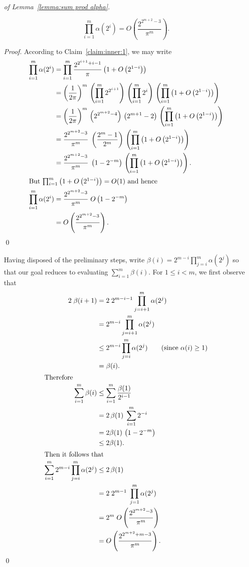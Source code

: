 \documentclass[a4paper,10pt]{llncs}
\begin{document}
\begin{proof}[of Lemma~\ref{lemma:sum prod alpha}]
\begin{claim}
\label{claim:inner:2}
$$
\prod_{i=1}^{m} \alpha(2^i)
=
O\left(
\frac{2^{2^{m+2}-3}}{\pi^m}
\right)
\text{.}
$$
\end{claim}
\begin{proof}
According to Claim~\ref{claim:inner:1}, we may write
\begin{align*}
\prod_{i=1}^{m} \alpha(2^i)
&=
\prod_{i=1}^{m} \frac{2^{2^{i+1} + i - 1}}{\pi}\left(1 + O\left(2^{1-i}\right)\right)
\\
&=
\left(
\frac{1}{2\pi}
\right)^{m}
\,
\left(
\prod_{i=1}^{m} 2^{2^{i+1}}
\right)
\,
\left(
\prod_{i=1}^{m} 2^i
\right)
\,
\left(
\prod_{i=1}^{m} \left(1 + O\left(2^{1-i}\right)\right)
\right)
\\
&=
\left(
\frac{1}{2\pi}
\right)^{m}
\,
\left(2^{2^{m+2}-4}\right)
\,
\left(2^{m+1}-2\right)
\,
\left(
\prod_{i=1}^{m} \left(1 + O\left(2^{1-i}\right)\right)
\right)
\\
&=
\frac{2^{2^{m+2}-3}}{\pi^m}
\;
\left(\frac{2^m-1}{2^m}\right)
\,
\left(
\prod_{i=1}^{m} \left(1 + O\left(2^{1-i}\right)\right)
\right)
\\
&=
\frac{2^{2^{m+2}-3}}{\pi^m}
\;
\left(1 - 2^{-m}\right)
\,
\left(
\prod_{i=1}^{m} \left(1 + O\left(2^{1-i}\right)\right)
\right)\text{.}
\\
\intertext{But
$\prod_{i=1}^{m} \left(1 + O\left(2^{1-i}\right)\right) = O(1)$ and hence}
\prod_{i=1}^{m} \alpha(2^i)
&=
\frac{2^{2^{m+2}-3}}{\pi^m}
\;
O\left(1 - 2^{-m}\right)
\\
&=
O\left(
\frac{2^{2^{m+2}-3}}{\pi^m}
\right)
\text{.}
\end{align*}
\qed
\end{proof}

Having disposed of the preliminary steps,
write $\beta(i) = 2^{m-i} \prod_{j=i}^{m} \alpha(2^j)$ so that our goal
reduces to evaluating $\sum_{i=1}^{m} \beta(i)$.
For $1 \leq i < m$, we first observe that
\begin{align*}
2\;\beta(i+1)
&=
2 \; 2^{m-i-1} \prod_{j=i+1}^{m} \alpha(2^{j}) 
\\
&= 
2^{m-i} \prod_{j=i+1}^{m} \alpha(2^{j}) 
\\
&\leq 
2^{m-i} \prod_{j=i}^{m} \alpha(2^{j}) \qquad\text{(since $\alpha(i) \geq 1$)}
\\
&= 
\beta(i)\text{.}
\\
\intertext{Therefore}
\sum_{i=1}^{m} \beta(i)
&\leq 
\sum_{i=1}^{m} \frac{\beta(1)}{2^{i-1}}
\\
&=
2\,\beta(1) \; \sum_{i=1}^{m} {2^{-i}}
\\
&=
2\beta(1) \, \left(1 - 2^{-m}\right)
\\
&\leq 
2\beta(1)\text{.}
\\
\intertext{Then it follows that}
\sum_{i=1}^{m}
2^{m-i} \prod_{j=i}^{m} \alpha(2^{j})
&\leq 
2\,\beta(1)
\\
&=
2 \; 2^{m-1} \; \prod_{j=1}^{m} \alpha(2^{j})
\\
&=
2^m \; O\left(
\frac{2^{2^{m+2}-3}}{\pi^m}
\right)
\\
&=
O\left(
\frac{2^{2^{m+2}+m-3}}{\pi^m}
\right)\text{.}
\end{align*}
\qed
\end{proof}
\end{document}
